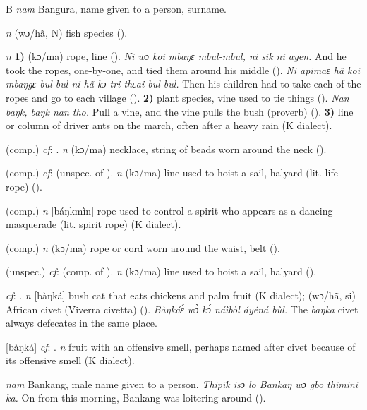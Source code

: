 \begin{letter}{B}
 \textit{nam} Bangura, name given to a person, surname. 

 \textit{n} (wɔ/hã, N) fish species (\citealt{Pichl1967}).

 \textit{n} \textbf{1)} (kɔ/ma) rope, line (\citealt{Pichl1967}). \textit{Ni wɔ koi mbaŋɛ mbul-mbul, ni sik ni ayen.} And he took the ropes, one-by-one, and tied them around his middle (\citealt{Sumner1921}). \textit{Ni apimaɛ hã koi mbaŋgɛ bul-bul ni hã kɔ tri thɛai bul-bul.} Then his children had to take each of the ropes and go to each village (\citealt{Sumner1921}). \textbf{2)} plant species, vine used to tie things (\citealt{Sumner1921}). \textit{Nan baŋk, baŋk nan tho.} Pull a vine, and the vine pulls the bush (proverb) (\citealt{TISLL1979}). \textbf{3)} line or column of driver ants on the march, often after a heavy rain (K dialect). 

 (comp.) \textit{cf}: . \textit{n} (kɔ/ma) necklace, string of beads worn around the neck (\citealt{Pichl1967}). 

 (comp.) \textit{cf}:  (unspec. of ). \textit{n} (kɔ/ma) line used to hoist a sail, halyard (lit. life rope) (\citealt{Pichl1967}).

 (comp.) \textit{n} [báŋkmìn] rope used to control a spirit who appears as a dancing masquerade (lit. spirit rope) (K dialect).

 (comp.) \textit{n} (kɔ/ma) rope or cord worn around the waist, belt (\citealt{Pichl1967}). 

 (unspec.) \textit{cf}:  (comp. of ). \textit{n} (kɔ/ma) line used to hoist a sail, halyard (\citealt{Pichl1967}).

 \textit{cf}: . \textit{n} [bàŋká] bush cat that eats chickens and palm fruit (K dialect); (wɔ/hã, si) African civet (Viverra civetta) (\citealt{Pichl1967}). \textit{Bàŋkáɛ́ wɔ̀ kɔ́ náìbòl áyéná bùl.} The \textit{baŋka} civet always defecates in the same place.

 [bàŋká] \textit{cf}: . \textit{n} fruit with an offensive smell, perhaps named after civet because of its offensive smell (K dialect).

 \textit{nam} Bankang, male name given to a person. \textit{Thipïk isɔ lo Bankaŋ wɔ gbo thimini ka.} On from this morning, Bankang was loitering around (\citealt{Pichl1967}). 


\end{letter}
